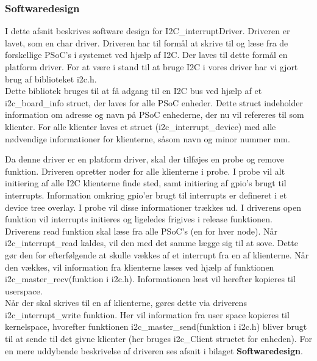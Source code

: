 \documentclass[Rapport/RPi/RPI.tex]{subfiles}
\begin{document}
\subsubsection{Softwaredesign}\label{sec:I2C_interruptDriver_design}
I dette afsnit beskrives software design for I2C\_interruptDriver. Driveren er lavet, som en char driver. Driveren har til formål at skrive til og læse fra de forskellige PSoC's i systemet ved hjælp af I2C. Der laves til dette formål en platform driver. For at være i stand til at bruge I2C i vores driver har vi gjort brug af biblioteket i2c.h.\\

Dette bibliotek bruges til at få adgang til en I2C bus ved hjælp af et i2c\_board\_info struct, der laves for alle PSoC enheder. Dette struct indeholder information om adresse og navn på PSoC enhederne, der nu vil refereres til som klienter. For alle klienter laves et struct (i2c\_interrupt\_device) med alle nødvendige informationer for klienterne, såsom navn og minor nummer mm.

Da denne driver er en platform driver, skal der tilføjes en probe og remove funktion. Driveren opretter noder for alle klienterne i probe.
I probe vil alt initiering af alle I2C klienterne finde sted, samt initiering af gpio's brugt til interrupts. Information omkring gpio'er brugt til interrupts er defineret i et device tree overlay. I probe vil disse informationer trækkes ud. I driverens open funktion vil interrupts initieres og ligeledes frigives i release funktionen. \\

Driverens read funktion skal læse fra alle PSoC's (en for hver node). Når i2c\_interrupt\_read kaldes, vil den med det samme lægge sig til at sove. Dette gør den for efterfølgende at skulle vækkes af et interrupt fra en af klienterne. Når den vækkes, vil information fra klienterne læses ved hjælp af funktionen i2c\_master\_recv(funktion i i2c.h). Informationen læst vil herefter kopieres til userspace. \\

Når der skal skrives til en af klienterne, gøres dette via driverens i2c\_interrupt\_write funktion. Her vil information fra user space kopieres til kernelspace, hvorefter funktionen i2c\_master\_send(funktion i i2c.h) bliver brugt til at sende til det givne klienter (her bruges i2c\_Client structet for enheden).
For en mere uddybende beskrivelse af driveren ses afsnit  i bilaget \textbf{Softwaredesign}.
\end{document}
